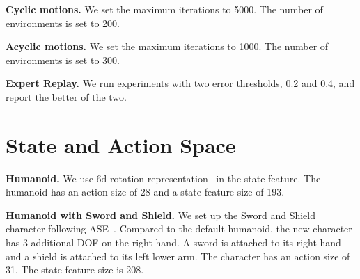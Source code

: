 \textbf{Cyclic motions.} We set the maximum iterations to 5000. The number of environments is set to 200. 

\textbf{Acyclic motions.} We set the maximum iterations to 1000. The number of environments is set to 300.

\textbf{Expert Replay.} We run experiments with two error thresholds, 0.2 and 0.4, and report the better of the two.

\section{State and Action Space}
\textbf{Humanoid.}
We use 6d rotation representation~\citep{zhou2019continuity} in the state feature. The humanoid has an action size of 28 and a state feature size of 193.

\textbf{Humanoid with Sword and Shield.}
We set up the Sword and Shield character following ASE~\citep{peng2022ase}. Compared to the default humanoid, the new character has 3 additional DOF on the right hand. A sword is attached to its right hand and a shield is attached to its left lower arm. The character has an action size of 31. The state feature size is 208.

\clearpage

